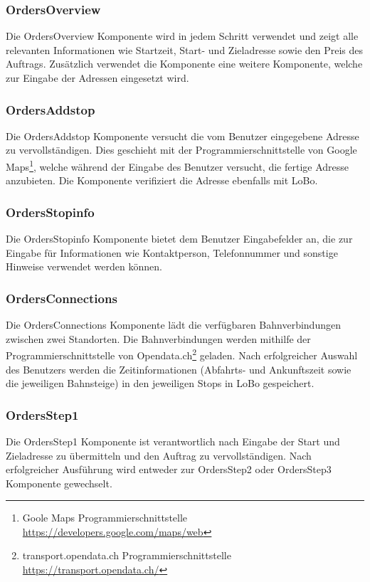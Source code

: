 \subsubsection{OrdersOverview}
Die OrdersOverview Komponente wird in jedem Schritt verwendet und zeigt alle relevanten Informationen wie Startzeit, Start- und Zieladresse sowie den Preis des Auftrags. Zusätzlich verwendet die Komponente eine weitere Komponente, welche zur Eingabe der Adressen eingesetzt wird.

\subsubsection{OrdersAddstop}
Die OrdersAddstop Komponente versucht die vom Benutzer eingegebene Adresse zu vervollständigen. Dies geschieht mit der Programmierschnittstelle von Google Maps\footnote{Goole Maps Programmierschnittstelle \url{https://developers.google.com/maps/web}}, welche während der Eingabe des Benutzer versucht, die fertige Adresse anzubieten. Die Komponente verifiziert die Adresse ebenfalls mit LoBo.

\subsubsection{OrdersStopinfo}
Die OrdersStopinfo Komponente bietet dem Benutzer Eingabefelder an, die zur Eingabe für Informationen wie Kontaktperson, Telefonnummer und sonstige Hinweise verwendet werden können.

\subsubsection{OrdersConnections}
Die OrdersConnections Komponente lädt die verfügbaren Bahnverbindungen zwischen zwei Standorten. Die Bahnverbindungen werden mithilfe der Programmierschnittstelle von Opendata.ch\footnote{transport.opendata.ch Programmierschnittstelle \url{https://transport.opendata.ch/}} geladen. Nach erfolgreicher Auswahl des Benutzers werden die Zeitinformationen (Abfahrts- und Ankunftszeit sowie die jeweiligen Bahnsteige) in den jeweiligen Stops in LoBo gespeichert.

\subsubsection{OrdersStep1}
Die OrdersStep1 Komponente ist verantwortlich nach Eingabe der Start und Zieladresse zu übermitteln und den Auftrag zu vervollständigen. Nach erfolgreicher Ausführung wird entweder zur OrdersStep2 oder OrdersStep3 Komponente gewechselt.

